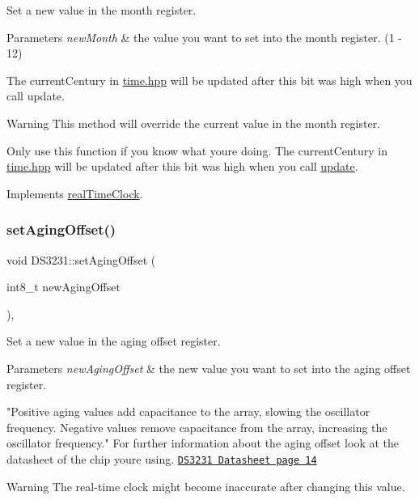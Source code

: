 Set a new value in the month register. 


\begin{DoxyParams}{Parameters}
{\em new\+Month} & the value you want to set into the month register. (1 -\/ 12)\\
\hline
\end{DoxyParams}
The current\+Century in \mbox{\hyperlink{time_8hpp_source}{time.\+hpp}} will be updated after this bit was high when you call update. \begin{DoxyWarning}{Warning}
This method will override the current value in the month register. 

Only use this function if you know what you\textquotesingle{}re doing. The current\+Century in \mbox{\hyperlink{time_8hpp_source}{time.\+hpp}} will be updated after this bit was high when you call \mbox{\hyperlink{class_d_s3231_a143ec57122d892ea0ec671a153352f2c}{update}}. 
\end{DoxyWarning}


Implements \mbox{\hyperlink{classreal_time_clock_a50e19a6b0aef44719e91e3e753da0dce}{real\+Time\+Clock}}.

\mbox{\label{class_d_s3231_a0a9dc2668139654b261c2feeb1d6e663}} 
\subsubsection{\texorpdfstring{set\+Aging\+Offset()}{setAgingOffset()}}
{\footnotesize\ttfamily void D\+S3231\+::set\+Aging\+Offset (\begin{DoxyParamCaption}\item[{int8\+\_\+t}]{new\+Aging\+Offset }\end{DoxyParamCaption})\hspace{0.3cm}{\ttfamily [override]}, {\ttfamily [virtual]}}



Set a new value in the aging offset register. 


\begin{DoxyParams}{Parameters}
{\em new\+Aging\+Offset} & the new value you want to set into the aging offset register.\\
\hline
\end{DoxyParams}
"Positive aging values add capacitance to the array, slowing the oscillator frequency. Negative values remove capacitance from the array, increasing the oscillator frequency." For further information about the aging offset look at the datasheet of the chip you\textquotesingle{}re using. \href{https://datasheets.maximintegrated.com/en/ds/DS3231.pdf}{\tt D\+S3231 Datasheet page 14} \begin{DoxyWarning}{Warning}
The real-\/time clock might become inaccurate after changing this value. 
\end{DoxyWarning}


